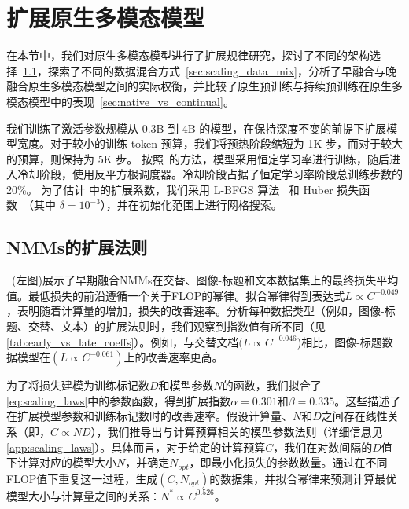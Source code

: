 \section{扩展原生多模态模型}

在本节中，我们对原生多模态模型进行了扩展规律研究，探讨了不同的架构选择~\cref{sec:scaling_laws_early}，探索了不同的数据混合方式~\cref{sec:scaling_data_mix}，分析了早融合与晚融合原生多模态模型之间的实际权衡，并比较了原生预训练与持续预训练在原生多模态模型中的表现~\cref{sec:native_vs_continual}。

我们训练了激活参数规模从 0.3B 到 4B 的模型，在保持深度不变的前提下扩展模型宽度。对于较小的训练 token 预算，我们将预热阶段缩短为 1K 步，而对于较大的预算，则保持为 5K 步。  
按照~\citet{hagele2024scaling}的方法，模型采用恒定学习率进行训练，随后进入冷却阶段，使用反平方根调度器。冷却阶段占据了恒定学习率阶段总训练步数的 20\%。  
为了估计  中的扩展系数，我们采用 L-BFGS 算法~\citep{lbfgs} 和 Huber 损失函数~\citep{Huber1992}（其中 $\delta = 10^{-3}$），并在初始化范围上进行网格搜索。





\vspace{-0.5cm}
\subsection{NMMs的扩展法则}
\label{sec:scaling_laws_early}

~(左图)展示了早期融合NMMs在交替、图像-标题和文本数据集上的最终损失平均值。最低损失的前沿遵循一个关于FLOP的幂律。拟合幂律得到表达式$L \propto C^{-0.049}$，表明随着计算量的增加，损失的改善速率。分析每种数据类型（例如，图像-标题、交替、文本）的扩展法则时，我们观察到指数值有所不同（见\cref{tab:early_vs_late_coeffs}）。例如，与交替文档$(L \propto C^{-0.046}$)相比，图像-标题数据模型在$(L \propto C^{-0.061})$上的改善速率更高。

为了将损失建模为训练标记数$D$和模型参数$N$的函数，我们拟合了\cref{eq:scaling_laws}中的参数函数，得到扩展指数$\alpha = 0.301$和$\beta = 0.335$。这些描述了在扩展模型参数和训练标记数时的改善速率。假设计算量、$N$和$D$之间存在线性关系（即，$C \propto ND$），我们推导出与计算预算相关的模型参数法则（详细信息见\cref{app:scaling_laws}）。具体而言，对于给定的计算预算$C$，我们在对数间隔的$D$值下计算对应的模型大小$N$，并确定$N_{opt}$，即最小化损失的参数数量。通过在不同FLOP值下重复这一过程，生成$(C, N_{opt})$的数据集，并拟合幂律来预测计算最优模型大小与计算量之间的关系：$N^* \propto C^{0.526}$。

